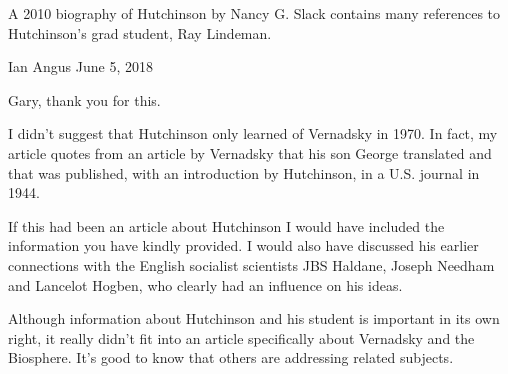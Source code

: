 \documentclass[11pt,a4paper]{article}
\begin{document}
A 2010 biography of Hutchinson by Nancy G. Slack contains many references to
Hutchinson’s grad student, Ray Lindeman.

Ian Angus June 5, 2018

Gary, thank you for this.

I didn’t suggest that Hutchinson only learned of Vernadsky in 1970. In fact,
my article quotes from an article by Vernadsky that his son George translated
and that was published, with an introduction by Hutchinson, in a U.S. journal
in 1944.

If this had been an article about Hutchinson I would have included the
information you have kindly provided. I would also have discussed his earlier
connections with the English socialist scientists JBS Haldane, Joseph Needham
and Lancelot Hogben, who clearly had an influence on his ideas.

Although information about Hutchinson and his student is important in its own
right, it really didn’t fit into an article specifically about Vernadsky and
the Biosphere. It’s good to know that others are addressing related subjects.
\end{document}
